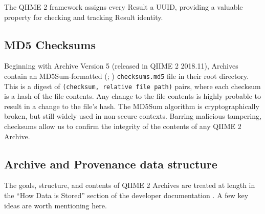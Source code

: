 The QIIME 2 framework assigns every Result a UUID, providing a valuable property
for checking and tracking Result identity. 

\subsection{MD5 Checksums}

Beginning with Archive Version 5 (released in QIIME 2 2018.11), Archives contain
an MD5Sum-formatted (\cite{rivest_md5_1992}; \cite{ulrich_drepper_md5sum1_2010})
\texttt{checksums.md5} file in their root directory. This is a digest of \texttt{(checksum, relative file path)}
pairs, where each checksum is a hash of the file contents.
Any change to the file contents is highly probable to result in a change to the
file’s hash. The MD5Sum algorithm is cryptographically broken, but still widely
used in non-secure contexts. Barring malicious tampering, checksums allow us to
confirm the integrity of the contents of any QIIME 2 Archive.

\subsection{Archive and Provenance data structure}
The goals, structure, and contents of QIIME 2 Archives are treated at length in
the “How Data is Stored” section of the developer documentation \parencite{qiime_2_development_team_how_2018}.
A few key ideas are worth mentioning here.


